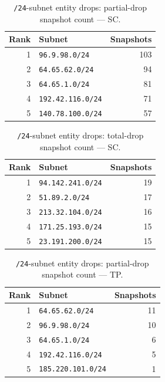 \documentclass[conference]{IEEEtran}
\begin{document}
\begin{table}[H]
\caption{\texttt{/24}-subnet entity drops: partial-drop snapshot count --- SC.}
\begin{center}\small
\begin{tabular}{|r|l|r|}
\hline
\textbf{Rank} & \textbf{Subnet} & \textbf{Snapshots} \\ \hline
1 & \texttt{96.9.98.0/24} & 103 \\ \hline
2 & \texttt{64.65.62.0/24} & 94 \\ \hline
3 & \texttt{64.65.1.0/24} & 81 \\ \hline
4 & \texttt{192.42.116.0/24} & 71 \\ \hline
5 & \texttt{140.78.100.0/24} & 57 \\ \hline
\end{tabular}
\label{tab:subnetdrop_partial_static_control}
\end{center}\end{table}
 
\begin{table}[H]
\caption{\texttt{/24}-subnet entity drops: total-drop snapshot count --- SC.}
\begin{center}\small
\begin{tabular}{|r|l|r|}
\hline
\textbf{Rank} & \textbf{Subnet} & \textbf{Snapshots} \\ \hline
1 & \texttt{94.142.241.0/24} & 19 \\ \hline
2 & \texttt{51.89.2.0/24} & 17 \\ \hline
3 & \texttt{213.32.104.0/24} & 16 \\ \hline
4 & \texttt{171.25.193.0/24} & 15 \\ \hline
5 & \texttt{23.191.200.0/24} & 15 \\ \hline
\end{tabular}
\label{tab:subnetdrop_total_static_control}
\end{center}\end{table}
 
\begin{table}[H]
\caption{\texttt{/24}-subnet entity drops: partial-drop snapshot count --- TP.}
\begin{center}\small
\begin{tabular}{|r|l|r|}
\hline
\textbf{Rank} & \textbf{Subnet} & \textbf{Snapshots} \\ \hline
1 & \texttt{64.65.62.0/24} & 11 \\ \hline
2 & \texttt{96.9.98.0/24} & 10 \\ \hline
3 & \texttt{64.65.1.0/24} & 6 \\ \hline
4 & \texttt{192.42.116.0/24} & 5 \\ \hline
5 & \texttt{185.220.101.0/24} & 1 \\ \hline
\end{tabular}
\label{tab:subnetdrop_partial_third_party_probe}
\end{center}\end{table}
 
\end{document}
